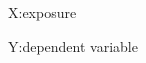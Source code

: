 \documentclass[10pt,aspectratio=43,mathserif,table]{beamer}
\begin{document}
\begin{frame}{X:exposure}
	\centering
\end{frame}



\begin{frame}{Y:dependent variable}
	\centering
\end{frame}
\end{document}
